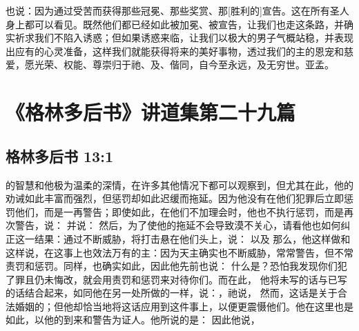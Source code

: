 也说：因为通过受苦而获得那些冠冕、那些奖赏、那[胜利的]宣告。这在所有圣人身上都可以看见。既然他们都已经如此被加冕、被宣告，让我们也走这条路，并确实祈求我们不陷入诱惑；但如果诱惑来临，让我们以极大的男子气概站稳，并表现出应有的心灵准备，这样我们就能获得将来的美好事物，透过我们的主的恩宠和慈爱，愿光荣、权能、尊崇归于祂、及、偕同，自今至永远，及无穷世。亚孟。\par



\section{《格林多后书》讲道集第二十九篇}


\subsection{格林多后书 13:1}

\par

的智慧和他极为温柔的深情，在许多其他情况下都可以观察到，但尤其在此，他的劝诫如此丰富而强烈，但惩罚却如此迟缓而拖延。因为他没有在他们犯罪后立即惩罚他们，而是一再警告；即使如此，在他们不加理会时，他也不执行惩罚，而是再次警告，说： 并说： 然后，为了使他的拖延不会导致漠不关心，请看他也如何纠正这一结果：通过不断威胁，将打击悬在他们头上，说： 以及  那么，他这样做和这样说，在这事上也效法万有的主：因为天主确实也不断威胁，常常警告，但不常责罚和惩罚。同样，也确实如此，因此他先前也说： 什么是？恐怕我发现你们犯了罪且仍未悔改，就会用责罚和惩罚来对待你们。而在此， 他将未写的话与已写的话结合起来，如同他在另一处所做的一样，说：，祂说，  然而，这话是关于合法婚姻的；但他却恰当地将这话应用到这件事上，以便更震慑他们。他在这里也是如此，以他的到来和警告为证人。他所说的是： 因此他说，\par

